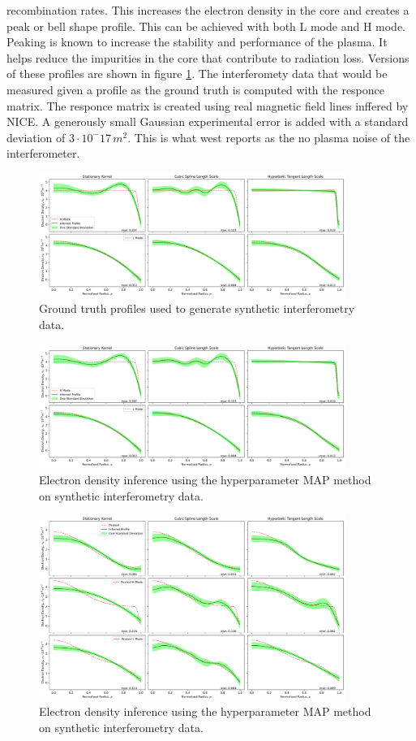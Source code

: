 recombination rates. This increases the electron density in the core and creates a peak or bell shape profile. This can be achieved with both L mode and H mode. Peaking is known to increase the stability and performance of the plasma. It helps reduce the impurities in the core that contribute to radiation loss. Versions of these profiles are shown in figure \ref{fig:groundtruth}. The interferomety data that would be measured given a profile as the ground truth is computed with the responce matrix. The responce matrix is created using real magnetic field lines inffered by NICE. A generously small Gaussian experimental error is added with a standard deviation of $3\cdot10^-17 \, m^2$. This is what \gls{west} reports as the no plasma noise of the interferometer. 

\begin{figure}[ht]
    \centering
    \includegraphics[width=10cm, angle=90]{images/Final/MAPsynthetic_final_hl.png}
    \caption{Ground truth profiles used to generate synthetic interferometry data.}
    \label{fig:groundtruth}
\end{figure}

\begin{figure}[ht]
    \centering
    \includegraphics[width=10cm, angle=90]{images/Final/MAPsynthetic_final_hl.png}
    \caption{Electron density inference using the hyperparameter MAP method on synthetic interferometry data.}
    \label{fig:mapsynthetic}
\end{figure}

\begin{figure}[ht]
    \centering
    \includegraphics[width=10cm, angle=90]{images/Final/MAPsynthetic_final_p.png}
    \caption{Electron density inference using the hyperparameter MAP method on synthetic interferometry data.}
    \label{fig:mapsynthetic}
\end{figure}

